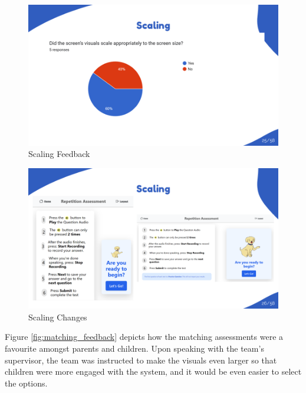 \documentclass{article}
\begin{document}
\begin{figure}[H]
  \centering
  \includegraphics[width=\textwidth]{images/slide25.png}
  \caption{Scaling Feedback}
  \label{fig:parents_scaling_feedback}
\end{figure}

\begin{figure}[H]
  \centering
  \includegraphics[width=\textwidth]{images/slide26.png}
  \caption{Scaling Changes}
  \label{fig:parents_scaling_changes}
\end{figure}

\newpage

Figure \ref{fig:matching_feedback} depicts how the matching assessments were a favourite amongst parents and children. Upon speaking with the team's supervisor, 
the team was instructed to make the visuals even larger so that children were more engaged with the system, and it would be even easier to select the options.
\end{document}
